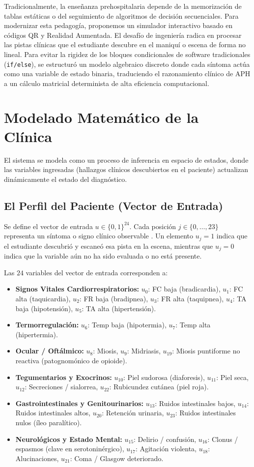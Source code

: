 \documentclass[conference,10pt,a4paper]{IEEEtran}
\begin{document}
Tradicionalmente, la enseñanza prehospitalaria depende de la memorización de tablas estáticas o del seguimiento de algoritmos de decisión secuenciales. Para modernizar esta pedagogía, proponemos un simulador interactivo basado en códigos QR y Realidad Aumentada. El desafío de ingeniería radica en procesar las pistas clínicas que el estudiante descubre en el maniquí o escena de forma no lineal. Para evitar la rigidez de los bloques condicionales de software tradicionales (\texttt{if/else}), se estructuró un modelo algebraico discreto donde cada síntoma actúa como una variable de estado binaria, traduciendo el razonamiento clínico de APH a un cálculo matricial determinista de alta eficiencia computacional.

\section{Modelado Matemático de la Clínica}
El sistema se modela como un proceso de inferencia en espacio de estados, donde las variables ingresadas (hallazgos clínicos descubiertos en el paciente) actualizan dinámicamente el estado del diagnóstico.

\subsection{El Perfil del Paciente (Vector de Entrada)}
Se define el vector de entrada $u \in \{0,1\}^{24}$. Cada posición $j \in \{0, \dots, 23\}$ representa un síntoma o signo clínico observable \cite{erickson2021}. Un elemento $u_j = 1$ indica que el estudiante descubrió y escaneó esa pista en la escena, mientras que $u_j = 0$ indica que la variable aún no ha sido evaluada o no está presente.

Las $24$ variables del vector de entrada corresponden a:
\begin{itemize}
    \item \textbf{Signos Vitales Cardiorrespiratorios:} $u_0$: FC baja (bradicardia), $u_1$: FC alta (taquicardia), $u_2$: FR baja (bradipnea), $u_3$: FR alta (taquipnea), $u_4$: TA baja (hipotensión), $u_5$: TA alta (hipertensión).
    \item \textbf{Termorregulación:} $u_6$: Temp baja (hipotermia), $u_7$: Temp alta (hipertermia).
    \item \textbf{Ocular / Oftálmico:} $u_8$: Miosis, $u_9$: Midriasis, $u_{19}$: Miosis puntiforme no reactiva (patognomónico de opioide).
    \item \textbf{Tegumentarios y Exocrinos:} $u_{10}$: Piel sudorosa (diaforesis), $u_{11}$: Piel seca, $u_{12}$: Secreciones / sialorrea, $u_{22}$: Rubicundez cutánea (piel roja).
    \item \textbf{Gastrointestinales y Genitourinarios:} $u_{13}$: Ruidos intestinales bajos, $u_{14}$: Ruidos intestinales altos, $u_{20}$: Retención urinaria, $u_{23}$: Ruidos intestinales nulos (íleo paralítico).
    \item \textbf{Neurológicos y Estado Mental:} $u_{15}$: Delirio / confusión, $u_{16}$: Clonus / espasmos (clave en serotoninérgico), $u_{17}$: Agitación violenta, $u_{18}$: Alucinaciones, $u_{21}$: Coma / Glasgow deteriorado.
\end{itemize}
\end{document}
